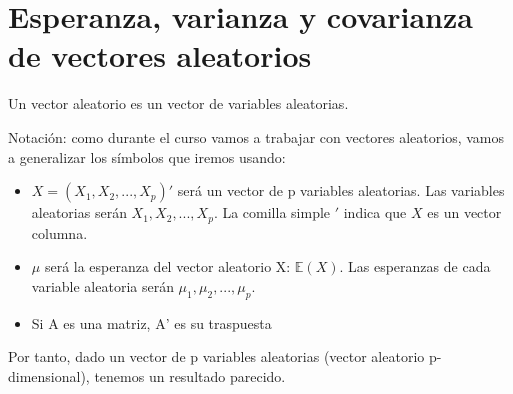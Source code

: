 \documentclass[nochap]{apuntes}
\begin{document}
\section{Esperanza, varianza y covarianza de vectores aleatorios}

Un vector aleatorio es un vector de variables aleatorias.

Notación: como durante el curso vamos a trabajar con vectores aleatorios, vamos a generalizar los símbolos que iremos usando:
\begin{itemize}
\item $X = (X_1, X_2,...,X_p)'$ será un vector de p variables aleatorias. Las variables aleatorias serán $X_1, X_2,...,X_p$. La comilla simple $'$ indica que $X$ es un vector columna.
\item $\mu$ será la esperanza del vector aleatorio X: $\mathbb{E}(X)$. Las esperanzas de cada variable aleatoria serán $\mu_1, \mu_2,...,\mu_p$.
\item Si A es una matriz, A' es su traspuesta
\end{itemize}

Por tanto, dado un vector de p variables aleatorias (vector aleatorio p-dimensional), tenemos un resultado parecido.
\end{document}

